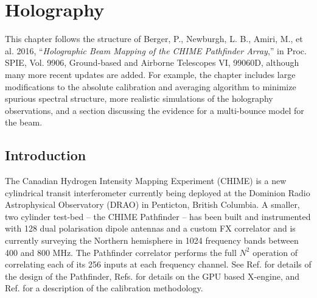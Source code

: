 \chapter{\label{chap:hol} Holography}
 



This chapter follows the structure of 
\newline
\newline
Berger, P., Newburgh, L. B., Amiri, M., et al. 2016, ``\textit{Holographic Beam Mapping of the CHIME Pathfinder Array},'' in Proc. SPIE, Vol. 9906, Ground-based and Airborne Telescopes VI, 99060D,
\newline
\newline
although many more recent updates are added. For example, the chapter includes large modifications to the absolute calibration and averaging algorithm to minimize spurious spectral structure, more realistic simulations of the holography observations, and a section discussing the evidence for a multi-bounce model for the beam.

\newpage

\section{Introduction} \label{ch:hol:sec:intro}

The Canadian Hydrogen Intensity Mapping Experiment (CHIME) is a new cylindrical transit interferometer currently being deployed at the Dominion Radio Astrophysical Observatory (DRAO) in Penticton, British Columbia. A smaller, two cylinder test-bed -- the CHIME Pathfinder -- has been built and instrumented with 128 dual polarisation dipole antennas and a custom FX correlator and is currently surveying the Northern hemisphere in 1024 frequency bands between 400 and 800 MHz. The Pathfinder correlator performs the full $N^2$ operation of correlating each of its 256 inputs at each frequency channel. See Ref. \citep{chimepath1} for details of the design of the Pathfinder, Refs. \citep{xeng1, xeng2, xeng3} for details on the GPU based X-engine, and Ref. \citep{chimepath2} for a description of the calibration methodology.

